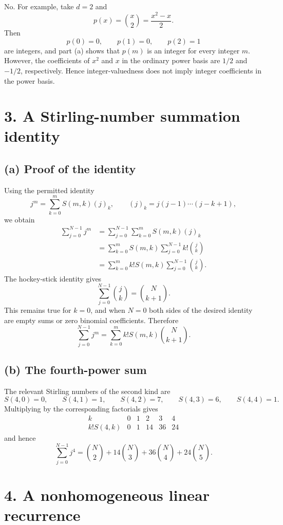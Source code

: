 \documentclass[11pt]{article}
\begin{document}
No. For example, take \(d=2\) and
\[
    p(x)=\binom{x}{2}=\frac{x^2-x}{2}.
\]
Then
\[
    p(0)=0,\qquad p(1)=0,\qquad p(2)=1
\]
are integers, and part (a) shows that \(p(m)\) is an integer for every
integer \(m\). However, the coefficients of \(x^2\) and \(x\) in the
ordinary power basis are \(1/2\) and \(-1/2\), respectively. Hence
integer-valuedness does not imply integer coefficients in the power basis.

\section*{3. A Stirling-number summation identity}

\subsection*{(a) Proof of the identity}

Using the permitted identity
\[
    j^m=\sum_{k=0}^{m}S(m,k)(j)_k,
    \qquad
    (j)_k=j(j-1)\cdots(j-k+1),
\]
we obtain
\[
\begin{aligned}
\sum_{j=0}^{N-1}j^m
  &=\sum_{j=0}^{N-1}\sum_{k=0}^{m}S(m,k)(j)_k\\
  &=\sum_{k=0}^{m}S(m,k)\sum_{j=0}^{N-1}k!\binom{j}{k}\\
  &=\sum_{k=0}^{m}k!S(m,k)\sum_{j=0}^{N-1}\binom{j}{k}.
\end{aligned}
\]
The hockey-stick identity gives
\[
    \sum_{j=0}^{N-1}\binom{j}{k}=\binom{N}{k+1}.
\]
This remains true for \(k=0\), and when \(N=0\) both sides of the desired
identity are empty sums or zero binomial coefficients. Therefore
\[
\boxed{
\sum_{j=0}^{N-1}j^m
    =\sum_{k=0}^{m}k!S(m,k)\binom{N}{k+1}.
}
\]

\subsection*{(b) The fourth-power sum}

The relevant Stirling numbers of the second kind are
\[
    S(4,0)=0,\qquad S(4,1)=1,\qquad S(4,2)=7,\qquad
    S(4,3)=6,\qquad S(4,4)=1.
\]
Multiplying by the corresponding factorials gives
\[
\begin{array}{c|ccccc}
k&0&1&2&3&4\\ \hline
k!S(4,k)&0&1&14&36&24
\end{array}
\]
and hence
\[
\boxed{
\sum_{j=0}^{N-1}j^4
   =\binom{N}{2}+14\binom{N}{3}
      +36\binom{N}{4}+24\binom{N}{5}.
}
\]

\section*{4. A nonhomogeneous linear recurrence}
\end{document}
